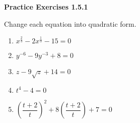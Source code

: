 \vspace{1ex}
\noindent\textbf{Practice Exercises 1.5.1}

\vspace{0.75ex}

Change each equation into quadratic form. 
\begin{multicols}{2}
\begin{enumerate}[label = \color{blue}\arabic*. ]
   \item $ x^{\tfrac{2}{3}} - 2x^{\tfrac{1}{3}} - 15 = 0 $
%
   \item $ y^{-6} - 9y^{-3} + 8 = 0 $
   \item $ z - 9\sqrt{z} + 14 = 0 $
   \item $ t^{4} - 4 = 0 $
   \item $ \left(\dfrac{t+2}{t}\right)^{2} + 8\left(\dfrac{t+2}{t}\right) + 7 = 0 $
\end{enumerate}
\end{multicols} 